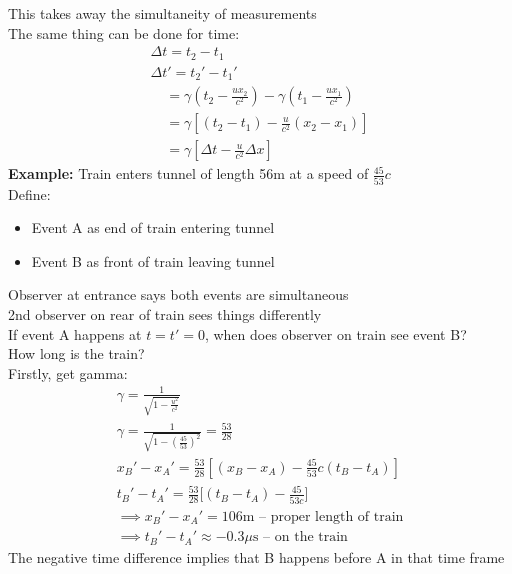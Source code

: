 \documentclass[a4paper, 11pt, fleqn, normalem]{report}
\begin{document}
This takes away the simultaneity of measurements \\
The same thing can be done for time:
\begin{gather*}
    \Delta t = t_{2} - t_{1} \\
    \Delta t' = t_{2}' -t_{1}' \\
    ~~~~\, = \gamma(t_{2} - \frac{ux_{2}}{c^{2}}) - \gamma(t_{1} - \frac{ux_{1}}{c^{2}}) \\
    ~~~~\, = \gamma[(t_{2} - t_{1}) - \frac{u}{c^{2}}(x_{2} - x_{1})] \\
    ~~~~\, = \gamma[\Delta t - \frac{u}{c^{2}}\Delta x]
\end{gather*}
\textbf{Example:} Train enters tunnel of length 56m at a speed of $\frac{45}{53}c$ \\
Define:
\begin{itemize}
    \item[] Event A as end of train entering tunnel
    \item[] Event B as front of train leaving tunnel
\end{itemize}
Observer at entrance says both events are simultaneous \\
2nd observer on rear of train sees things differently \\
If event A happens at $t = t' = 0$, when does observer on train see event B? \\
How long is the train? \\
Firstly, get gamma:
\begin{gather*}
    \gamma = \frac{1}{\sqrt{1 - \tfrac{u^{2}}{c^{2}}}} \\
    \gamma = \frac{1}{\sqrt{1 - (\tfrac{45}{53})^{2}}} = \frac{53}{28} \\
    x_{B}' - x_{A}' = \frac{53}{28}[(x_{B} - x_{A}) - \frac{45}{53}c(t_{B} - t_{A})] \\
    t_{B}' - t_{A}' = \frac{53}{28}\Big[(t_{B} - t_{A}) - \frac{45}{53c}\Big] \\
    \implies x_{B}' -x_{A}' = 106\text{m -- proper length of train} \\
    \implies t_{B}' - t_{A}' \approx -0.3\mu\text{s -- on the train}
\end{gather*}
The negative time difference implies that B happens before A in that time frame
\end{document}
